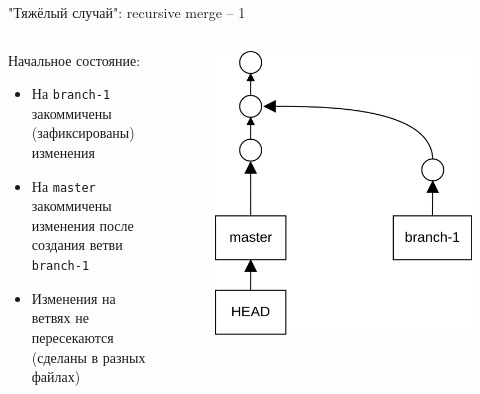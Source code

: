 \documentclass[presentation]{beamer}
\begin{document}

\begin{frame}[fragile]{"Тяжёлый случай": recursive merge -- 1}
  \begin{columns}
    \begin{column}{.4\textwidth}
      Начальное состояние:
      \begin{itemize}
      \item На \texttt{branch-1} закоммичены (зафиксированы) изменения
      \item На \texttt{master} закоммичены изменения после создания
        ветви \texttt{branch-1}
      \item Изменения на ветвях не пересекаются (сделаны в разных файлах)
      \end{itemize}
      \end{column}
      \begin{column}{.6\textwidth}
        \begin{figure}[htb]
          \centering
          \includegraphics[height=.7\textheight]{git-operation-merge-2-1}
        \end{figure}
      \end{column}
    \end{columns}
\end{frame}
\end{document}
